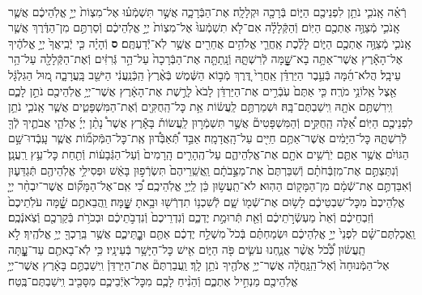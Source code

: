 \documentclass[twoside, openany, parskip=half, 11pt]{book}
\begin{document}
\begin{sometimes}
\begin{footnotesize}
\begin{multicols}{2}
\\
רְֿאֵ֗ה אָֽנֹכִ֛י נֹתֵ֥ן לִפְנֵיכֶ֖ם הַיּ֑וֹם בְּֿרָכָ֖ה וּקְלָלָֽה׃ אֶת־הַבְּֿרָכָ֑ה אֲשֶׁ֣ר תִּשְׁמְֿע֗וּ אֶל־מִצְוֹת֙ יְיָ֣ אֱלֹֽהֵיכֶ֔ם אֲשֶׁ֧ר אָֽנֹכִ֛י מְֿצַוֶּ֥ה אֶתְכֶ֖ם הַיּֽוֹם׃ וְֿהַקְּֿלָלָ֗ה אִם־לֹ֤א תִשְׁמְֿעוּ֙ אֶל־מִצְוֹת֙ יְיָ֣ אֱלֹֽהֵיכֶ֔ם וְֿסַרְתֶּ֣ם מִן־הַדֶּ֔רֶךְ אֲשֶׁ֧ר אָֽנֹכִ֛י מְֿצַוֶּ֥ה אֶתְכֶ֖ם הַיּ֑וֹם לָלֶ֗כֶת אַֽחֲרֵ֛י אֱלֹהִ֥ים אֲחֵרִ֖ים אֲשֶׁ֥ר לֹֽא־יְֿֿדַעְתֶּֽם׃ \textbf{ס} וְֿהָיָ֗ה כִּ֤י יְֿבִֽיאֲךָ֙ יְיָ֣ אֱלֹהֶ֔יךָ אֶל־הָאָ֕רֶץ אֲשֶׁר־אַתָּ֥ה בָא־שׇׇׇׇׇׇָׁ֖מָּה לְֿרִשְׁתָּ֑הּ וְֿנָֽתַתָּ֤ה אֶת־הַבְּֿרָכָה֙ עַל־הַ֣ר גְּֿרִזִּ֔ים וְֿאֶת־הַקְּֿלָלָ֖ה עַל־הַ֥ר עֵיבָֽל׃ הֲלֹא־הֵ֜מָּה בְּֿעֵ֣בֶר הַיַּרְדֵּ֗ן אַֽחֲרֵי֙ דֶּ֚רֶךְ מְֿב֣וֹא הַשֶּׁ֔מֶשׁ בְּֿאֶ֨רֶץ֙ הַֽכְּֿנַֽעֲנִ֔י הַיּשֵׁ֖ב בָּֽעֲרָבָ֑ה מ֚וּל הַגִּלְגָּ֔ל אֵ֖צֶל אֵֽלוֹנֵ֥י מֹרֶֽה׃ כִּ֤י אַתֶּם֙ עֹֽבְֿרִ֣ים אֶת־הַיַּרְדֵּ֔ן לָבֹא֙ לָרֶ֣שֶׁת אֶת־הָאָ֔רֶץ אֲשֶׁר־יְיָ֥ אֱלֹֽהֵיכֶ֖ם נֹתֵ֣ן לָכֶ֑ם וִֽירִשְׁתֶּ֥ם אֹתָ֖הּ וִֽישַׁבְתֶּם־בָּֽהּ׃
וּשְׁמַרְתֶּ֣ם לַֽעֲשׂ֔וֹת אֵ֥ת כׇּל־הַֽחֻקִּ֖ים וְֿאֶת־הַמִּשְׁפָּטִ֑ים אֲשֶׁ֧ר אָֽנֹכִ֛י נֹתֵ֥ן לִפְנֵיכֶ֖ם הַיּֽוֹם׃
אֵ֠לֶּה הַֽחֻקִּ֣ים וְֿהַמִּשְׁפָּטִים֘ אֲשֶׁ֣ר תִּשְׁמְֿר֣וּן לַֽעֲשׂוֹת֒ בָּאָ֕רֶץ אֲשֶׁר֩ נָתַ֨ן יְיָ֜ אֱלֹהֵ֧י אֲבֹתֶ֛יךָ לְֿךָ֖ לְֿרִשְׁתָּ֑הּ כׇּל־הַיָּמִ֔ים אֲשֶׁר־אַתֶּ֥ם חַיִּ֖ים עַל־הָֽאֲדָמָֽה׃ אַבֵּ֣ד תְּֿ֠אַבְּֿד֠וּן אֶֽת־כׇּל־הַמְּֿקֹמ֞וֹת אֲשֶׁ֧ר עָֽבְֿדוּ־שָׁ֣ם הַגּוֹיִ֗ם אֲשֶׁ֥ר אַתֶּ֛ם יֹֽרְֿשִׁ֥ים אֹתָ֖ם אֶת־אֱלֹֽהֵיהֶ֑ם עַל־הֶֽהָרִ֤ים הָֽרָמִים֙ וְֿעַל־הַגְּֿבָע֔וֹת וְֿתַ֖חַת כׇּל־עֵ֥ץ רַֽעֲנָֽן׃ וְֿנִתַּצְתֶּ֣ם אֶת־מִזְבְּֿחֹתָ֗ם וְֿשִׁבַּרְתֶּם֙ אֶת־מַצֵּ֣בֹתָ֔ם וַֽאֲשֵֽׁרֵיהֶם֙ תִּשְׂרְֿפ֣וּן בָּאֵ֔שׁ וּפְסִילֵ֥י אֱלֹֽהֵיהֶ֖ם תְּֿגַדֵּע֑וּן וְֿאִבַּדְתֶּ֣ם אֶת־שְֿׁמָ֔ם מִן־הַמָּק֖וֹם הַהֽוּא׃ לֹא־תַֽעֲשׂ֣וּן כֵּ֔ן לַֽיְיָ֖ אֱלֹֽהֵיכֶֽם׃ כִּ֠י אִֽם־אֶל־הַמָּק֞וֹם אֲשֶׁר־יִבְחַ֨ר יְיָ֤ אֱלֹֽהֵיכֶם֙ מִכׇּל־שִׁבְטֵיכֶ֔ם לָשׂ֥וּם אֶת־שְֿׁמ֖וֹ שָׁ֑ם לְֿשִׁכְנ֥וֹ תִדְרְֿשׁ֖וּ וּבָ֥אתָ שׇׇׇׇׇׇׇׇָּֽׁמָּה׃  וַֽהֲבֵאתֶ֣ם שׇׇׇׇׇׇָׁ֗מָּה עֹלֹֽתֵיכֶם֙ וְֿזִבְחֵיכֶ֔ם וְֿאֵת֙ מַעְשְֿׂרֹ֣תֵיכֶ֔ם וְֿאֵ֖ת תְּֿרוּמַ֣ת יֶדְכֶ֑ם וְֿנִדְרֵיכֶם֙ וְֿנִדְבֹ֣תֵיכֶ֔ם וּבְכֹרֹ֥ת בְּֿקַרְכֶ֖ם וְֿצֹֽאנְֿכֶֽם׃ וַֽאֲכַלְתֶּם־שָׁ֗ם לִפְנֵי֙ יְיָ֣ אֱלֹֽהֵיכֶ֔ם וּשְׂמַחְתֶּ֗ם בְּֿכֹל֙ מִשְׁלַ֣ח יֶדְכֶ֔ם אַתֶּ֖ם וּבׇׇׇׇׇׇׇׇׇׇׇׇׇׇָֽתֵּיכֶ֑ם אֲשֶׁ֥ר בֵּֽרַכְךָ֖ יְיָ֥ אֱלֹהֶֽיךָ׃ לֹ֣א תַֽעֲשׂ֔וּן כְּֿ֠כֹ֠ל אֲשֶׁ֨ר אֲנַ֧חְנוּ עֹשִׂ֛ים פֹּ֖ה הַיּ֑וֹם אִ֖ישׁ כׇּל־הַיָּשָׁ֥ר בְּֿעֵינָֽיו׃ כִּ֥י לֹֽא־בָאתֶ֖ם עַד־עׇׇׇׇׇׇָ֑תָּה אֶל־הַמְּֿנוּחָה֙ וְֿאֶל־הַֽנַּֽחֲלָ֔ה אֲשֶׁר־יְיָ֥ אֱלֹהֶ֖יךָ נֹתֵ֥ן לָֽךְ׃ וַֽעֲבַרְתֶּם֘ אֶת־הַיַּרְדֵּן֒ וִֽישַׁבְתֶּ֣ם בָּאָ֔רֶץ אֲשֶׁר־יְיָ֥ אֱלֹֽהֵיכֶ֖ם מַנְחִ֣יל אֶתְכֶ֑ם וְֿהֵנִ֨יחַ לָכֶ֧ם מִכׇּל־אֹֽיְֿבֵיכֶ֛ם מִסָּבִ֖יב וִֽישַׁבְתֶּם־בֶּֽטַח׃


\end{multicols}
\end{footnotesize}
\end{sometimes}
\end{document}
